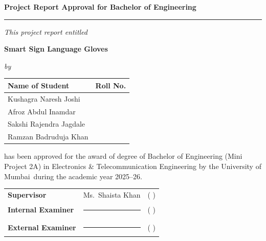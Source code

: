 \documentclass[12pt,a4paper]{report}
\newcommand{\ShortProjectTitle}{Smart Sign Language Gloves}
\newcommand{\UniversityName}{University of Mumbai}
\newcommand{\SupervisorName}{Ms.\ Shaista Khan}
\newcommand{\AcademicYear}{2025--26}
\newcommand{\StudentOne}{Kushagra Naresh Joshi}
\newcommand{\StudentTwo}{Afroz Abdul Inamdar}
\newcommand{\StudentThree}{Sakshi Rajendra Jagdale}
\newcommand{\StudentFour}{Ramzan Badruduja Khan}
\newcommand{\RollOne}{22}
\newcommand{\RollTwo}{18}
\newcommand{\RollThree}{19}
\newcommand{\RollFour}{24}
\newcommand{\frontmatterheading}[1]{%
  \begin{center}
    {\Large\bfseries #1\par}
    \vspace{0.08in}
    \rule{0.74\textwidth}{0.8pt}
  \end{center}
  \vspace{0.18in}
}
\begin{document}
\setcounter{page}{1}

\newpage
{}
\thispagestyle{plain}
\frontmatterheading{Project Report Approval for Bachelor of Engineering}
\begin{center}
  {\itshape This project report entitled}
  \vspace{0.15cm}

  {\Large\bfseries \ShortProjectTitle \par}
  \vspace{0.18cm}
  {\itshape by}
\end{center}

\vspace{0.2cm}
\begin{center}
  \renewcommand{\arraystretch}{1.25}
  \begin{tabular}{>{\raggedright\arraybackslash}p{} >{\centering\arraybackslash}p{}}
    \toprule
    \textbf{Name of Student} & \textbf{Roll No.} \\
    \midrule
    \StudentOne & \RollOne \\
    \StudentTwo & \RollTwo \\
    \StudentThree & \RollThree \\
    \StudentFour & \RollFour \\
    \bottomrule
  \end{tabular}
\end{center}

\vspace{0.25cm}
\begin{center}
  \begin{minipage}{0.9\textwidth}
    \noindent has been approved for the award of degree of Bachelor of Engineering (Mini Project 2A) in Electronics \& Telecommunication Engineering by the \UniversityName\ during the academic year \AcademicYear.
  \end{minipage}
\end{center}

\vspace{0.55cm}
\begin{center}
  \renewcommand{\arraystretch}{1.55}
  \begin{tabular}{>{\raggedright\arraybackslash}p{} >{\raggedright\arraybackslash}p{} >{\centering\arraybackslash}p{}}
    \textbf{Supervisor} & \SupervisorName & ( ) \\
    \textbf{Internal Examiner} & \rule{2.2in}{0.4pt} & ( ) \\
    \textbf{External Examiner} & \rule{2.2in}{0.4pt} & ( ) \\
  \end{tabular}
\end{center}
\end{document}
